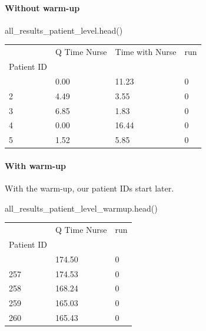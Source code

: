 \documentclass[
  letterpaper,
  DIV=11,
  numbers=noendperiod]{scrreprt}
\let\oldparagraph\paragraph
\renewcommand{\paragraph}[1]{\oldparagraph{#1}\mbox{}}
\newenvironment{Shaded}{}{}
\newcommand{\NormalTok}[1]{\textcolor[rgb]{0.14,0.16,0.18}{#1}}
\begin{document}
\paragraph{Without warm-up}\label{without-warm-up}

\begin{Shaded}
\begin{Highlighting}[]
\NormalTok{all\_results\_patient\_level.head()}
\end{Highlighting}
\end{Shaded}

\label{results_p_level_head}
\begin{longtable}[]{@{}llll@{}}
\toprule\noalign{}
& Q Time Nurse & Time with Nurse & run \\
Patient ID & & & \\
\midrule\noalign{}
\endhead
\bottomrule\noalign{}
\endlastfoot
1 & 0.00 & 11.23 & 0 \\
2 & 4.49 & 3.55 & 0 \\
3 & 6.85 & 1.83 & 0 \\
4 & 0.00 & 16.44 & 0 \\
5 & 1.52 & 5.85 & 0 \\
\end{longtable}

\paragraph{With warm-up}\label{with-warm-up}

With the warm-up, our patient IDs start later.

\begin{Shaded}
\begin{Highlighting}[]
\NormalTok{all\_results\_patient\_level\_warmup.head()}
\end{Highlighting}
\end{Shaded}

\label{results_warmup_p_level_head}
\begin{longtable}[]{@{}lll@{}}
\toprule\noalign{}
& Q Time Nurse & run \\
Patient ID & & \\
\midrule\noalign{}
\endhead
\bottomrule\noalign{}
\endlastfoot
256 & 174.50 & 0 \\
257 & 174.53 & 0 \\
258 & 168.24 & 0 \\
259 & 165.03 & 0 \\
260 & 165.43 & 0 \\
\end{longtable}
\end{document}
